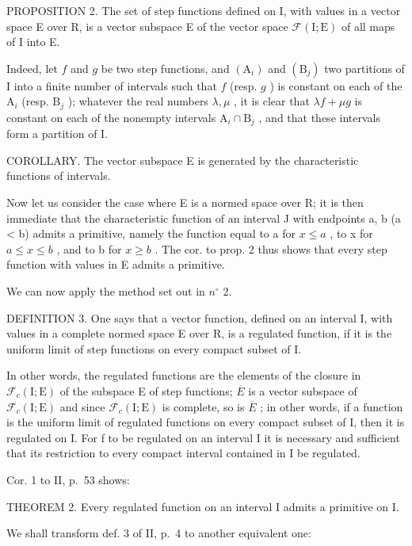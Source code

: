 PROPOSITION 2. The set of step functions defined on I, with values in a vector space E over R, is a vector subspace E of the vector space \(\mathcal{F}(\mathrm{I};\mathrm{E})\) of all maps of I into E.

Indeed, let \(f\) and \(g\) be two step functions, and \((\mathrm{A}_i)\) and \((\mathrm{B}_j)\) two partitions of I into a finite number of intervals such that \(f\) (resp. \(g\) ) is constant on each of the \(\mathrm{A}_i\) (resp. \(\mathrm{B}_j\) ); whatever the real numbers \(\lambda, \mu\) , it is clear that \(\lambda f + \mu g\) is constant on each of the nonempty intervals \(\mathrm{A}_i \cap \mathrm{B}_j\) , and that these intervals form a partition of I.

COROLLARY. The vector subspace E is generated by the characteristic functions of intervals.

Now let us consider the case where E is a normed space over R; it is then immediate that the characteristic function of an interval J with endpoints a, b (a \textless{} b) admits a primitive, namely the function equal to a for \(x \leqslant a\) , to x for \(a \leqslant x \leqslant b\) , and to b for \(x \geqslant b\) . The cor. to prop. 2 thus shows that every step function with values in E admits a primitive.

We can now apply the method set out in \(n^{\circ}\) 2.

DEFINITION 3. One says that a vector function, defined on an interval I, with values in a complete normed space E over R, is a regulated function, if it is the uniform limit of step functions on every compact subset of I.

In other words, the regulated functions are the elements of the closure in \(\mathcal{F}_{c}(\mathrm{I};\mathrm{E})\) of the subspace E of step functions; \(\overline{E}\) is a vector subspace of \(\mathcal{F}_{c}(\mathrm{I};\mathrm{E})\) and since \(\mathcal{F}_{c}(\mathrm{I};\mathrm{E})\) is complete, so is \(\overline{E}\) ; in other words, if a function is the uniform limit of regulated functions on every compact subset of I, then it is regulated on I. For f to be regulated on an interval I it is necessary and sufficient that its restriction to every compact interval contained in I be regulated.

Cor. 1 to II, p.~53 shows:

THEOREM 2. Every regulated function on an interval I admits a primitive on I.

We shall transform def. 3 of II, p.~4 to another equivalent one:

